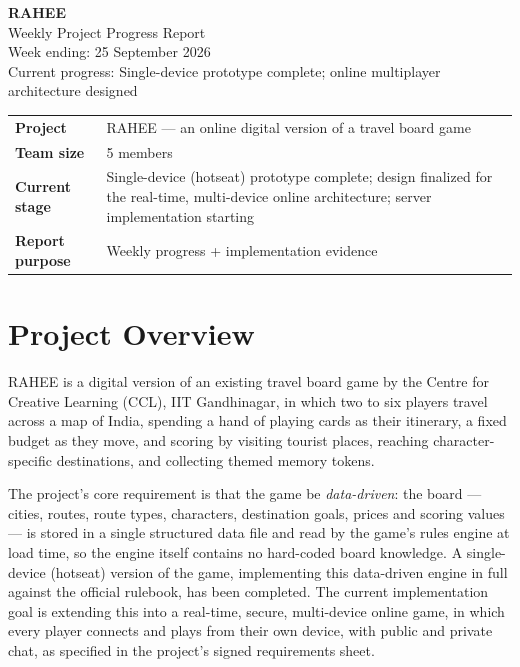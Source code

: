 \documentclass[11pt]{article}
\title{}
\date{}
\begin{document}
\pagestyle{plain}

\begin{center}
  {\LARGE \bfseries RAHEE} \\[4pt]
  {\Large Weekly Project Progress Report} \\[6pt]
  Week ending: 25 September 2026 \\
  Current progress: Single-device prototype complete; online multiplayer architecture designed
\end{center}

\vspace{8pt}

\begin{tabularx}{\textwidth}{@{} l Y @{}}
  \toprule
  \textbf{Project} & RAHEE --- an online digital version of a travel board game \\
  \textbf{Team size} & 5 members \\
  \textbf{Current stage} & Single-device (hotseat) prototype complete; design finalized for the real-time, multi-device online architecture; server implementation starting \\
  \textbf{Report purpose} & Weekly progress + implementation evidence \\
  \bottomrule
\end{tabularx}

\section{Project Overview}

RAHEE is a digital version of an existing travel board game by the Centre for Creative Learning (CCL), IIT Gandhinagar, in which two to six players travel across a map of India, spending a hand of playing cards as their itinerary, a fixed budget as they move, and scoring by visiting tourist places, reaching character-specific destinations, and collecting themed memory tokens.

The project's core requirement is that the game be \emph{data-driven}: the board --- cities, routes, route types, characters, destination goals, prices and scoring values --- is stored in a single structured data file and read by the game's rules engine at load time, so the engine itself contains no hard-coded board knowledge. A single-device (hotseat) version of the game, implementing this data-driven engine in full against the official rulebook, has been completed. The current implementation goal is extending this into a real-time, secure, multi-device online game, in which every player connects and plays from their own device, with public and private chat, as specified in the project's signed requirements sheet.
\end{document}
